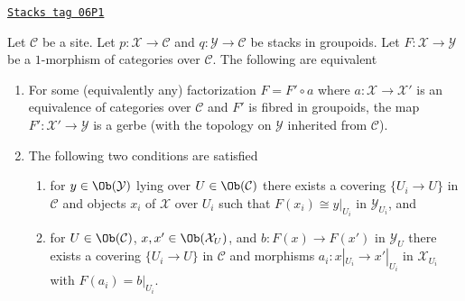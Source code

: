 \begin{lemma}
\label{stacks-lemma-when-gerbe}
\href{https://stacks.math.columbia.edu/tag/06P1}{\texttt{Stacks tag 06P1}}

Let $\mathcal{C}$ be a site. Let $p : \mathcal{X} \to \mathcal{C}$
and $q : \mathcal{Y} \to \mathcal{C}$ be stacks in groupoids.
Let $F : \mathcal{X} \to \mathcal{Y}$ be a $1$-morphism of categories
over $\mathcal{C}$. The following are equivalent
\begin{enumerate}
\item For some (equivalently any) factorization $F = F' \circ a$ where
$a : \mathcal{X} \to \mathcal{X}'$ is an equivalence of categories over
$\mathcal{C}$ and $F'$ is fibred in groupoids, the map
$F' : \mathcal{X}' \to \mathcal{Y}$ is a gerbe (with the topology
on $\mathcal{Y}$ inherited from $\mathcal{C}$).
\item The following two conditions are satisfied
\begin{enumerate}
\item for $y \in \Ob(\mathcal{Y})$ lying over
$U \in \Ob(\mathcal{C})$ there exists a covering
$\{U_i \to U\}$ in $\mathcal{C}$ and objects $x_i$ of $\mathcal{X}$
over $U_i$ such that $F(x_i) \cong y|_{U_i}$ in $\mathcal{Y}_{U_i}$, and
\item for $U \in \Ob(\mathcal{C})$,
$x, x' \in \Ob(\mathcal{X}_U)$, and $b : F(x) \to F(x')$ in
$\mathcal{Y}_U$ there exists
a covering $\{U_i \to U\}$ in $\mathcal{C}$ and morphisms
$a_i : x|_{U_i} \to x'|_{U_i}$ in $\mathcal{X}_{U_i}$ with
$F(a_i) = b|_{U_i}$.
\end{enumerate}
\end{enumerate}
\end{lemma}

